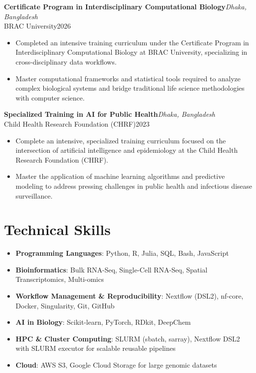 \documentclass[
  11pt,
  letterpaper,
  DIV=11,
  numbers=noendperiod]{scrartcl}
\providecommand{\tightlist}{%
  \setlength{\itemsep}{0pt}\setlength{\parskip}{0pt}}
\begin{document}
\noindent

\begin{minipage}{\linewidth}
\textbf{Certificate Program in Interdisciplinary Computational Biology}\hfill \textit{Dhaka, Bangladesh}\\
BRAC University\hfill 2026
\end{minipage}
\begin{itemize}[nosep,topsep=2pt,leftmargin=1em]
  \item Completed an intensive training curriculum under the Certificate Program in Interdisciplinary Computational Biology at BRAC University, specializing in cross-disciplinary data workflows.
  \item Master computational frameworks and statistical tools required to analyze complex biological systems and bridge traditional life science methodologies with computer science.
\end{itemize}
\vspace{5pt}

\noindent

\begin{minipage}{\linewidth}
\textbf{Specialized Training in AI for Public Health}\hfill \textit{Dhaka, Bangladesh}\\
Child Health Research Foundation (CHRF)\hfill 2023
\end{minipage}
\begin{itemize}[nosep,topsep=2pt,leftmargin=1em]
  \item Complete an intensive, specialized training curriculum focused on the intersection of artificial intelligence and epidemiology at the Child Health Research Foundation (CHRF).
  \item Master the application of machine learning algorithms and predictive modeling to address pressing challenges in public health and infectious disease surveillance.
\end{itemize}
\vspace{5pt}

\section{Technical Skills}\label{technical-skills}

\begin{itemize}
\tightlist
\item
  \textbf{Programming Languages}: Python, R, Julia, SQL, Bash,
  JavaScript
\item
  \textbf{Bioinformatics}: Bulk RNA-Seq, Single-Cell RNA-Seq, Spatial
  Transcriptomics, Multi-omics
\item
  \textbf{Workflow Management \& Reproducibility}: Nextflow (DSL2),
  nf-core, Docker, Singularity, Git, GitHub
\item
  \textbf{AI in Biology}: Scikit-learn, PyTorch, RDkit, DeepChem
\item
  \textbf{HPC \& Cluster Computing}: SLURM (sbatch, sarray), Nextflow
  DSL2 with SLURM executor for scalable reusable pipelines
\item
  \textbf{Cloud}: AWS S3, Google Cloud Storage for large genomic
  datasets
\end{itemize}
\end{document}
